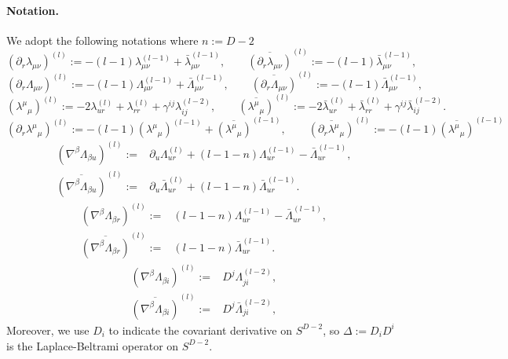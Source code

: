 \documentclass[a4paper,12pt]{article}
\begin{document}
\paragraph{Notation.} We adopt the following notations where $n:=D-2$
\begin{equation}
(\partial_r \lambda_{\mu \nu})^{(l)}:=-(l-1)\lambda_{\mu \nu}^{(l-1)}+\bar \lambda_{\mu \nu}^{(l-1)},
\qquad
\overline{(\partial_r \lambda_{\mu \nu})}^{(l)}:=-(l-1)\bar \lambda_{\mu \nu}^{(l-1)},
\label{convdevrl}
\end{equation}
\begin{equation}
(\partial_r \Lambda_{\mu \nu})^{(l)}:=-(l-1)\Lambda_{\mu \nu}^{(l-1)}+\bar \Lambda_{\mu \nu}^{(l-1)},
\qquad
\overline{(\partial_r \Lambda_{\mu \nu})}^{(l)}:=-(l-1)\bar \Lambda_{\mu \nu}^{(l-1)},
\label{convdevrL}
\end{equation}
\begin{equation}
(\lambda^\mu{}_\mu)^{(l)}:=-2\lambda_{ur}^{(l)}+\lambda_{rr}^{(l)}+\gamma^{ij}\lambda_{ij}^{(l-2)},
\qquad
\overline{(\lambda^\mu{}_\mu)}^{(l)}:=-2\bar\lambda_{ur}^{(l)}+\bar\lambda_{rr}^{(l)}+\gamma^{ij}\bar\lambda_{ij}^{(l-2)}.
\label{convtrace}
\end{equation}
\begin{equation}
    (\partial_r\lambda^\mu{}_\mu)^{(l)}:=-(l-1)(\lambda^\mu{}_\mu)^{(l-1)}+\overline{(\lambda^\mu{}_\mu)}^{(l-1)}, \qquad \overline{(\partial_r\lambda^\mu{}_\mu)}^{(l)}:=-(l-1)\overline{(\lambda^\mu{}_\mu)}^{(l-1)}
\end{equation}
\begin{align}
(\nabla^\beta\Lambda_{\beta u})^{(l)}:={}&
\partial_u\Lambda_{ur}^{(l)}
+(l-1-n)\Lambda_{ur}^{(l-1)}
-\bar\Lambda_{ur}^{(l-1)},\\
\overline{(\nabla^\beta\Lambda_{\beta u})}^{(l)}:={}&
\partial_u\bar\Lambda_{ur}^{(l)}
+(l-1-n)\bar\Lambda_{ur}^{(l-1)} .
\end{align}
\begin{align}
(\nabla^\beta\Lambda_{\beta r})^{(l)}:={}&
(l-1-n)\Lambda_{ur}^{(l-1)}
-\bar\Lambda_{ur}^{(l-1)},\\
\overline{(\nabla^\beta\Lambda_{\beta r})}^{(l)}:={}&
(l-1-n)\bar\Lambda_{ur}^{(l-1)} .
\end{align}
\begin{align}
(\nabla^\beta\Lambda_{\beta i})^{(l)}:={}&
 D^j\Lambda_{ji}^{(l-2)},\\
\overline{(\nabla^\beta\Lambda_{\beta i})}^{(l)}:={}& D^j\bar\Lambda_{ji}^{(l-2)} ,
\end{align}
Moreover, we use $D_i$ to indicate the covariant derivative on $S^{D-2}$, so $\Delta:= D_iD^i$ is the Laplace-Beltrami operator on $S^{D-2}$.
\end{document}
